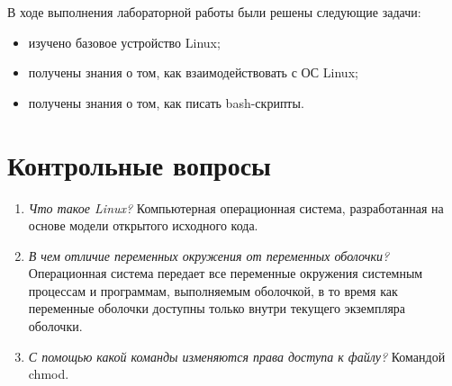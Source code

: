 В ходе выполнения лабораторной работы были решены следующие задачи:
\begin{itemize}
	\item изучено базовое устройство Linux;
	\item получены знания о том, как взаимодействовать с ОС Linux;
	\item получены знания о том, как писать bash-скрипты.
\end{itemize}

\section*{Контрольные вопросы}

\begin{enumerate}
	\item \textit{Что такое Linux?} Компьютерная операционная система, разработанная на основе модели открытого исходного кода.
	\item \textit{В чем отличие переменных окружения от переменных оболочки?} Операционная система передает все переменные окружения системным процессам и программам, выполняемым оболочкой, в то время как переменные оболочки доступны только внутри текущего экземпляра оболочки.
	\item \textit{С помощью какой команды изменяются права доступа к файлу?} Командой chmod. %
\end{enumerate}
